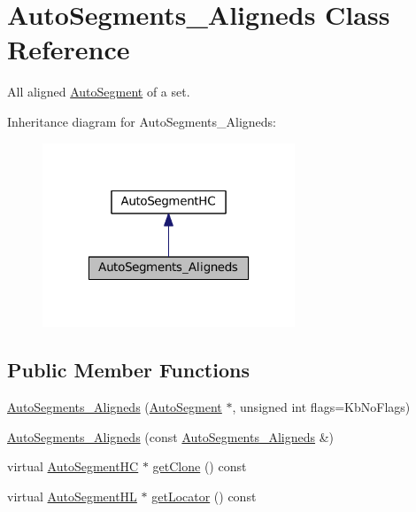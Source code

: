 \hypertarget{classKatabatic_1_1AutoSegments__Aligneds}{}\section{Auto\+Segments\+\_\+\+Aligneds Class Reference}
\label{classKatabatic_1_1AutoSegments__Aligneds}


All aligned \mbox{\hyperlink{classKatabatic_1_1AutoSegment}{Auto\+Segment}} of a set.  




Inheritance diagram for Auto\+Segments\+\_\+\+Aligneds\+:\nopagebreak
\begin{figure}[H]
\begin{center}
\leavevmode
\includegraphics[width=214pt]{classKatabatic_1_1AutoSegments__Aligneds__inherit__graph}
\end{center}
\end{figure}
\subsection*{Public Member Functions}
\begin{DoxyCompactItemize}
\item 
\mbox{\hyperlink{classKatabatic_1_1AutoSegments__Aligneds_a97d48d49a2372cf289d321e6abf81c2d}{Auto\+Segments\+\_\+\+Aligneds}} (\mbox{\hyperlink{classKatabatic_1_1AutoSegment}{Auto\+Segment}} $\ast$, unsigned int flags=Kb\+No\+Flags)
\item 
\mbox{\hyperlink{classKatabatic_1_1AutoSegments__Aligneds_aade683d2c99dc069e2cd5c8b942f8912}{Auto\+Segments\+\_\+\+Aligneds}} (const \mbox{\hyperlink{classKatabatic_1_1AutoSegments__Aligneds}{Auto\+Segments\+\_\+\+Aligneds}} \&)
\item 
virtual \mbox{\hyperlink{namespaceKatabatic_acb3628dc7705fefe38a665cfe43efa6e}{Auto\+Segment\+HC}} $\ast$ \mbox{\hyperlink{classKatabatic_1_1AutoSegments__Aligneds_a5b26b0698bdcb40cbf51b250dfb21858}{get\+Clone}} () const
\item 
virtual \mbox{\hyperlink{namespaceKatabatic_a40ef13471fd0e797b75d3c436813fe65}{Auto\+Segment\+HL}} $\ast$ \mbox{\hyperlink{classKatabatic_1_1AutoSegments__Aligneds_a07665c070fcc269aec02ce842f384483}{get\+Locator}} () const
\end{DoxyCompactItemize}


